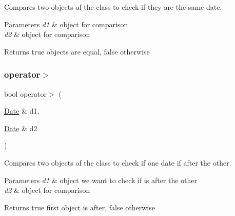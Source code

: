 Compares two objects of the class to check if they are the same date. 


\begin{DoxyParams}{Parameters}
{\em d1} & object for comparison \\
\hline
{\em d2} & object for comparison\\
\hline
\end{DoxyParams}
\begin{DoxyReturn}{Returns}
true objects are equal, false otherwise 
\end{DoxyReturn}
\mbox{\label{group___date_ga3d72003c210f3adc692715148aa7cf26}} 
\subsubsection{\texorpdfstring{operator$>$}{operator>}}
{\footnotesize\ttfamily bool operator$>$ (\begin{DoxyParamCaption}\item[{\hyperlink{class_date}{Date} \&}]{d1,  }\item[{\hyperlink{class_date}{Date} \&}]{d2 }\end{DoxyParamCaption})\hspace{0.3cm}{\ttfamily [friend]}}



Compares two objects of the class to check if one date if after the other. 


\begin{DoxyParams}{Parameters}
{\em d1} & object we want to check if is after the other \\
\hline
{\em d2} & object for comparison\\
\hline
\end{DoxyParams}
\begin{DoxyReturn}{Returns}
true first object is after, false otherwise 
\end{DoxyReturn}
